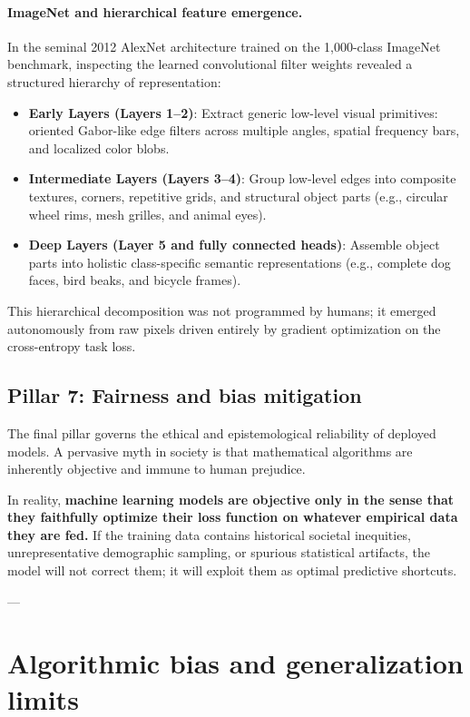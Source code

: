 \paragraph{ImageNet and hierarchical feature emergence.}
In the seminal 2012 AlexNet architecture trained on the 1,000-class ImageNet benchmark, inspecting the learned convolutional filter weights revealed a structured hierarchy of representation:
\begin{itemize}[noitemsep]
  \item \textbf{Early Layers (Layers 1--2)}: Extract generic low-level visual primitives: oriented Gabor-like edge filters across multiple angles, spatial frequency bars, and localized color blobs.
  \item \textbf{Intermediate Layers (Layers 3--4)}: Group low-level edges into composite textures, corners, repetitive grids, and structural object parts (e.g., circular wheel rims, mesh grilles, and animal eyes).
  \item \textbf{Deep Layers (Layer 5 and fully connected heads)}: Assemble object parts into holistic class-specific semantic representations (e.g., complete dog faces, bird beaks, and bicycle frames).
\end{itemize}
This hierarchical decomposition was not programmed by humans; it emerged autonomously from raw pixels driven entirely by gradient optimization on the cross-entropy task loss.

\subsection{Pillar 7: Fairness and bias mitigation}
\label{sec:pillar_7_avoid_bias}

The final pillar governs the ethical and epistemological reliability of deployed models. A pervasive myth in society is that mathematical algorithms are inherently objective and immune to human prejudice. 

In reality, \textbf{machine learning models are objective only in the sense that they faithfully optimize their loss function on whatever empirical data they are fed.} If the training data contains historical societal inequities, unrepresentative demographic sampling, or spurious statistical artifacts, the model will not correct them; it will exploit them as optimal predictive shortcuts.

---

\section{Algorithmic bias and generalization limits}
\label{sec:societal_bias_and_fairness}

